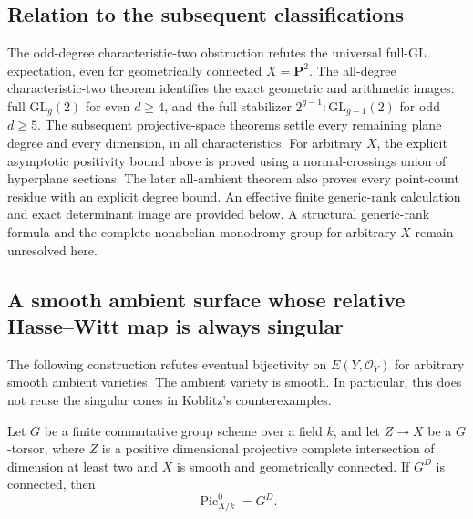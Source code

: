 \subsection{Relation to the subsequent classifications}
The odd-degree characteristic-two obstruction refutes the universal
full-$\mathrm{GL}$ expectation, even for geometrically connected
$X=\mathbf P^2$.  The all-degree characteristic-two theorem identifies
the exact geometric and arithmetic images: full $\mathrm{GL}_g(2)$
for even $d\ge4$, and the full stabilizer
$2^{g-1}\!:\mathrm{GL}_{g-1}(2)$ for odd $d\ge5$.
The subsequent projective-space theorems settle every remaining
plane degree and every dimension, in all characteristics.
For arbitrary $X$, the explicit asymptotic positivity bound above is
proved using a normal-crossings union of hyperplane sections.
The later all-ambient theorem also proves every point-count residue
with an explicit degree bound. An effective finite generic-rank
calculation and exact determinant image are provided below.
A structural generic-rank formula and the complete nonabelian
monodromy group for arbitrary $X$ remain unresolved here.

\subsection{A smooth ambient surface whose relative Hasse--Witt map is always singular}
\label{subsec:relative-ordinarity-counterexample}

The following construction refutes eventual bijectivity on
$E(Y,\mathcal O_Y)$ for arbitrary smooth ambient varieties.  The
ambient variety is smooth.  In particular, this does not reuse the
singular cones in Koblitz's counterexamples.

\begin{lemma}\label{lem:picard-finite-quotient}
Let $G$ be a finite commutative group scheme over a field $k$, and
let $Z\to X$ be a $G$-torsor, where $Z$ is a positive dimensional
projective complete intersection of dimension at least two and $X$
is smooth and geometrically connected.  If $G^D$ is connected, then
\[
 \operatorname{Pic}_{X/k}^0=G^D.
\]
\end{lemma}

